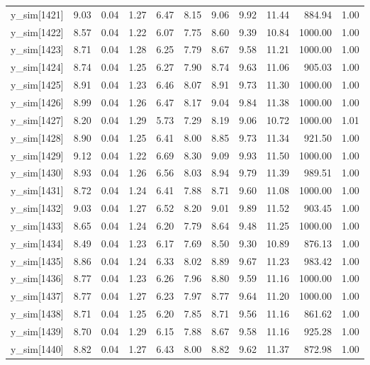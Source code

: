 \begin{table}[ht]
\begin{tabular}{rrrrrrrrrrr}
  y\_sim[1421] & 9.03 & 0.04 & 1.27 & 6.47 & 8.15 & 9.06 & 9.92 & 11.44 & 884.94 & 1.00 \\ 
  y\_sim[1422] & 8.57 & 0.04 & 1.22 & 6.07 & 7.75 & 8.60 & 9.39 & 10.84 & 1000.00 & 1.00 \\ 
  y\_sim[1423] & 8.71 & 0.04 & 1.28 & 6.25 & 7.79 & 8.67 & 9.58 & 11.21 & 1000.00 & 1.00 \\ 
  y\_sim[1424] & 8.74 & 0.04 & 1.25 & 6.27 & 7.90 & 8.74 & 9.63 & 11.06 & 905.03 & 1.00 \\ 
  y\_sim[1425] & 8.91 & 0.04 & 1.23 & 6.46 & 8.07 & 8.91 & 9.73 & 11.30 & 1000.00 & 1.00 \\ 
  y\_sim[1426] & 8.99 & 0.04 & 1.26 & 6.47 & 8.17 & 9.04 & 9.84 & 11.38 & 1000.00 & 1.00 \\ 
  y\_sim[1427] & 8.20 & 0.04 & 1.29 & 5.73 & 7.29 & 8.19 & 9.06 & 10.72 & 1000.00 & 1.01 \\ 
  y\_sim[1428] & 8.90 & 0.04 & 1.25 & 6.41 & 8.00 & 8.85 & 9.73 & 11.34 & 921.50 & 1.00 \\ 
  y\_sim[1429] & 9.12 & 0.04 & 1.22 & 6.69 & 8.30 & 9.09 & 9.93 & 11.50 & 1000.00 & 1.00 \\ 
  y\_sim[1430] & 8.93 & 0.04 & 1.26 & 6.56 & 8.03 & 8.94 & 9.79 & 11.39 & 989.51 & 1.00 \\ 
  y\_sim[1431] & 8.72 & 0.04 & 1.24 & 6.41 & 7.88 & 8.71 & 9.60 & 11.08 & 1000.00 & 1.00 \\ 
  y\_sim[1432] & 9.03 & 0.04 & 1.27 & 6.52 & 8.20 & 9.01 & 9.89 & 11.52 & 903.45 & 1.00 \\ 
  y\_sim[1433] & 8.65 & 0.04 & 1.24 & 6.20 & 7.79 & 8.64 & 9.48 & 11.25 & 1000.00 & 1.00 \\ 
  y\_sim[1434] & 8.49 & 0.04 & 1.23 & 6.17 & 7.69 & 8.50 & 9.30 & 10.89 & 876.13 & 1.00 \\ 
  y\_sim[1435] & 8.86 & 0.04 & 1.24 & 6.33 & 8.02 & 8.89 & 9.67 & 11.23 & 983.42 & 1.00 \\ 
  y\_sim[1436] & 8.77 & 0.04 & 1.23 & 6.26 & 7.96 & 8.80 & 9.59 & 11.16 & 1000.00 & 1.00 \\ 
  y\_sim[1437] & 8.77 & 0.04 & 1.27 & 6.23 & 7.97 & 8.77 & 9.64 & 11.20 & 1000.00 & 1.00 \\ 
  y\_sim[1438] & 8.71 & 0.04 & 1.25 & 6.20 & 7.85 & 8.71 & 9.56 & 11.16 & 861.62 & 1.00 \\ 
  y\_sim[1439] & 8.70 & 0.04 & 1.29 & 6.15 & 7.88 & 8.67 & 9.58 & 11.16 & 925.28 & 1.00 \\ 
  y\_sim[1440] & 8.82 & 0.04 & 1.27 & 6.43 & 8.00 & 8.82 & 9.62 & 11.37 & 872.98 & 1.00 \\ 

\end{tabular}
\end{table}
